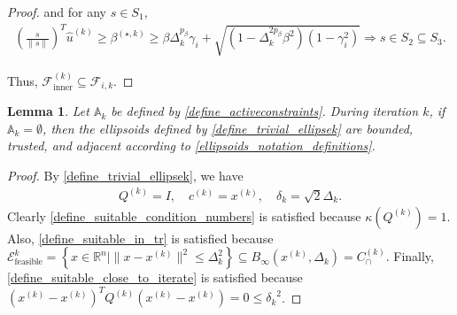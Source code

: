 \documentclass{article}
\newtheorem{lemma}[theorem]{Lemma}
\theoremstyle{case}
\numberwithin{theorem}{subsection}
\newcommand{\activeconstraintsk}{{\mathbb A_{k}}}
\newcommand{\bs}{{\beta^{(\star, k)}}}
\newcommand{\capcones}{{C^{(k)}_{\cap}}}
\newcommand{\ck}{{c^{(k)}}}
\newcommand{\dk}{\Delta_k}
\newcommand{\fcki}{{\mathcal {F}^{(k)}_{\textrm{inner}}}}
\newcommand{\fik}{{\mathcal F_{i, k}}}
\newcommand{\huk}{{{\hat u}^{(k)}}}
\newcommand{\qk}{{Q^{(k)}}}
\newcommand{\Rn}{\mathbb R^n}
\newcommand{\sdk}{{\delta_k}}
\newcommand{\tr}{{ B_{\infty}\left(\xk, \dk\right) }}
\newcommand{\unshiftedellipsoid}{{\mathcal E^k_{\textrm{feasible}}}}
\newcommand{\xk}{{x^{(k)}}}
\begin{document}
\begin{proof}
and for any $s\in S_1$,
\begin{align*}
\left(\frac{s}{\|s\|}\right)^T\huk \ge \bs 
\ge \beta\dk^{p_{\beta}}\gamma_i + \sqrt{(1 - \dk^{2p_{\beta}}\beta^2)\left(1 - \gamma_i^2\right)}
\Longrightarrow s \in S_2 \subseteq S_3.
\end{align*}

Thus, $\fcki \subseteq \fik$.
\end{proof}



\begin{lemma}
\label{ellsoid_is_suitable_theorem_p1}
Let $\activeconstraintsk$ be defined by \cref{define_activeconstraints}.
During iteration $k$, if $\activeconstraintsk = \emptyset$, then the ellipsoids defined by \cref{define_trivial_ellipsek} 
are bounded, trusted, and adjacent according to \cref{ellipsoids_notation_definitions}.

\end{lemma}
\begin{proof}
By \cref{define_trivial_ellipsek}, we have
\begin{align*}
\qk = I, \quad \ck = \xk, \quad \sdk = \sqrt{2} \dk.
\end{align*}
Clearly \cref{define_suitable_condition_numbers} is satisfied because $\kappa(\qk) = 1$.
Also, \cref{define_suitable_in_tr} is satisfied because $\unshiftedellipsoid = \left\{x \in \Rn | \|x - \xk\|^2 \le \dk^2 \right\} \subseteq \tr = \capcones$.
Finally, \cref{define_suitable_close_to_iterate} is satisfied because $(\xk - \xk)^T\qk(\xk - \xk) = 0 \le \sdk^2$.
\end{proof}
\end{document}
